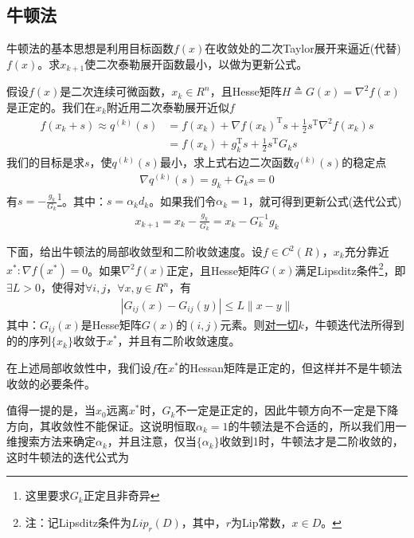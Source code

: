     \subsection{牛顿法}
        \par
        牛顿法的基本思想是利用目标函数$f(x)$在收敛处的二次Taylor展开来逼近(代替)$f(x)$。求$x_{k+1}$使二次泰勒展开函数最小，以做为更新公式。
        \par
        假设$f(x)$是二次连续可微函数，$x_k \in R^n$，且Hesse矩阵$H \triangleq G(x) = {\nabla}^2 f(x)$是正定的。我们在$x_k$附近用二次泰勒展开近似$f$
        \begin{align*}
        f(x_{k}+s) \approx q^{(k)}(s) & = f(x_k)+\nabla f(x_k)^\mathrm{T} s+\frac 12 s^\mathrm{T} \nabla^2 f(x_k) s\\
        & =  f(x_k)+g_k^\mathrm{T} s+\frac 12 s^\mathrm{T}G_ks
        \end{align*}
        我们的目标是求$s$，使$q^{(k)}(s)$最小，求上式右边二次函数$q^{(k)}(s)$的稳定点
        \begin{align*}
        \nabla q^{(k)}(s) = g_k + G_k s=0
        \end{align*}
        有$s =-\frac {g_k}{G_k}$\footnote{这里要求$G_k$正定且非奇异}。其中：$s={\alpha}_k d_k$。如果我们令${\alpha}_k = 1$，就可得到更新公式(迭代公式)
        \begin{align*}
        x_{k+1} = x_k-\frac {g_k}{G_k}=x_k-G^{-1}_k g_k
        \end{align*}
        \par
        下面，给出牛顿法的局部收敛型和二阶收敛速度。设$f \in C^2(R)$，$x_k$充分靠近$x^*:\nabla f(x^*)=0$。如果${\nabla}^2 f(x)$正定，且Hesse矩阵$G(x)$满足Lipsditz条件\footnote{注：记Lipsditz条件为$Lip_r(D)$，其中，$r$为Lip常数，$x\in D$。}，即$\exists L>0$，使得对$\forall i,j$，$\forall x,y \in R^n$，有
        \begin{align*}
        |G_{ij}(x)-G_{ij}(y)| \le L\|x-y\|
        \end{align*}
        其中：$G_{ij}(x)$是Hesse矩阵$G(x)$的$(i,j)$元素。则\underline{对一切$k$}，牛顿迭代法所得到的的序列$\{x_k\}$收敛于$x^*$，并且有二阶收敛速度。
        \par
        在上述局部收敛性中，我们设$f$在$x^*$的Hessan矩阵是正定的，但这样并不是牛顿法收敛的必要条件。
        \par
        值得一提的是，当$x_0$远离$x^*$时，$G_k$不一定是正定的，因此牛顿方向不一定是下降方向，其收敛性不能保证。这说明恒取${\alpha}_k=1$的牛顿法是不合适的，所以我们用一维搜索方法来确定${\alpha}_k$，并且注意，仅当$\{{\alpha}_k\}$收敛到1时，牛顿法才是二阶收敛的，这时牛顿法的迭代公式为
